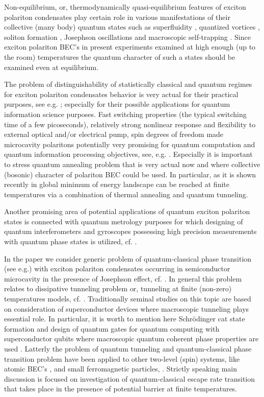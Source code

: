 \documentclass[aps, pre, preprint, groupedaddress, superscriptaddress, showkeys, showpacs] {revtex4-1}
\begin{document}
Non-equilibrium, or, thermodynamically quasi-equilibrium features of exciton polariton condensates play certain role in various manifestations of their collective (many body) quantum states such as superfluidity \cite{Carusotto_2013,Amo_2009}, quantized vortices \cite{Lagoudakis_2008,Lagoudakis_2009}, soliton formation \cite{Sich}, Josephson oscillations and macroscopic self-trapping \cite{Abbarchi,Lagoudakis_2010}.
Since exciton polariton BEC's in present experiments examined at high enough (up to the room) temperatures the quantum character of such a states should be examined even at equilibrium.

The problem of distinguishability of statistically classical and quantum regimes for exciton polariton condensates behavior is very actual for their practical purposes, see e.g. \cite{Dominici}; especially for their possible applications for quantum information science purposes.
Fast switching properties (the typical switching time of a few picoseconds), relatively strong nonlinear response and flexibility to external optical and/or electrical pump, spin degrees of freedom made microcavity polaritons potentially very promising for quantum computation and quantum information processing objectives, see, e.g. \cite{Demirchyan,Pagel,Kyriienko,Solnyshkov_2015, Dominici}.
Especially it is important to stress quantum annealing problem \cite{Yan} that is very actual now and where collective (bosonic) character of polariton BEC could be used.
In particular, as it is shown recently in \cite{Lewenstein} global minimum of energy landscape can be reached at finite temperatures via a combination of thermal annealing and quantum tunneling. 

Another promising area of potential applications of quantum exciton polariton states is connected with quantum metrology purposes for which designing of quantum interferometers and gyroscopes possessing high precision measurements with quantum phase states is utilized, cf. \cite{Pezze, Gulevich}.
  
In the paper we consider generic problem  of quantum-classical phase transition (see e.g.\cite{Chudnovsky_1997}) with exciton polariton condensates occurring in semiconductor microcavity in the presence of Josephson effect, cf. \cite{Aleiner, Shelykh_2008, Borgh_2010}.
In general this problem relates to dissipative tunneling problem or, tunneling at finite (non-zero) temperatures models, cf. \cite{Caldeira, Larkin, Riseborough}.
Traditionally  seminal studies on this topic are based on consideration of superconductor devices \cite{Ankerhold} where macroscopic tunneling plays essential role.
In particular, it is worth to mention here Schr\"odinger cat state formation \cite{Leggett} and design of quantum gates for quantum computing with superconductor qubits where macroscopic quantum coherent phase properties are used \cite{Makhlin}.
Latterly the problem of quantum tunneling and quantum-classical phase transition problem have been applied to other two-level (spin) systems, like atomic BEC's \cite{Zhang}, and small ferromagnetic particles, \cite{Owerre}.
Strictly speaking main discussion is focused on investigation of quantum-classical escape rate transition that takes place in the presence of potential barrier at finite temperatures.
  
\end{document}
